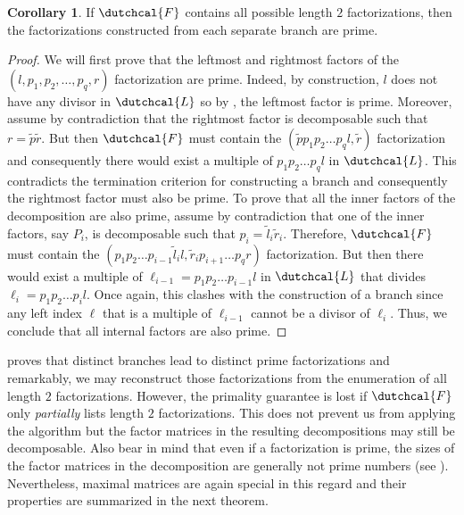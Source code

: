 \documentclass{article}
\numberwithin{equation}{section}
\theoremstyle{definition}
\newtheorem{corollary}[definition]{Corollary}
\begin{document}
\begin{corollary}
\label{cor: primality_2}
If $\dutchcal{F}$ contains all possible length $2$ factorizations, then the factorizations constructed from each separate branch are prime.    
\end{corollary}
\begin{proof}
We will first prove that the leftmost and rightmost factors of the $(l,p_1,p_2,\dots,p_q,r)$ factorization are prime. Indeed, by construction, $l$ does not have any divisor in $\dutchcal{L}$ so by , the leftmost factor is prime. Moreover, assume by contradiction that the rightmost factor is decomposable such that $r=\tilde{p}\tilde{r}$. But then $\dutchcal{F}$ must contain the $(\tilde{p}p_1 p_2 \dots p_q l, \tilde{r})$ factorization and consequently there would exist a multiple of $p_1 p_2 \dots p_q l$ in $\dutchcal{L}$. This contradicts the termination criterion for constructing a branch and consequently the rightmost factor must also be prime. To prove that all the inner factors of the decomposition are also prime, assume by contradiction that one of the inner factors, say $P_i$, is decomposable such that $p_i=\tilde{l}_i\tilde{r}_{i}$. Therefore, $\dutchcal{F}$ must contain the $(p_1p_2\dots p_{i -1}\tilde{l}_il, \tilde{r}_{i}p_{i+1}\dots p_q r)$ factorization. But then there would exist a multiple of $\ell_{i-1}=p_1p_2\dots p_{i-1} l$ in $\dutchcal{L}$ that divides $\ell_i=p_1p_2\dots p_i l$. Once again, this clashes with the construction of a branch since any left index $\ell$ that is a multiple of $\ell_{i-1}$ cannot be a divisor of $\ell_i$. Thus, we conclude that all internal factors are also prime.
\end{proof}

 proves that distinct branches lead to distinct prime factorizations and remarkably, we may reconstruct those factorizations from the enumeration of all length $2$ factorizations. However, the primality guarantee is lost if $\dutchcal{F}$ only \emph{partially} lists length $2$ factorizations. This does not prevent us from applying the algorithm but the factor matrices in the resulting decompositions may still be decomposable. Also bear in mind that even if a factorization is prime, the sizes of the factor matrices in the decomposition are generally not prime numbers (see ). Nevertheless, maximal matrices are again special in this regard and their properties are summarized in the next theorem.
\end{document}
